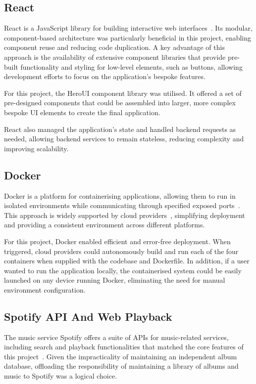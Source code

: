 \subsection{React}
React is a JavaScript library for building interactive web interfaces~\cite{React}. Its modular, component-based architecture was particularly beneficial in this project, enabling component reuse and reducing code duplication. A key advantage of this approach is the availability of extensive component libraries that provide pre-built functionality and styling for low-level elements, such as buttons, allowing development efforts to focus on the application's bespoke features.

For this project, the HeroUI component library was utilised. It offered a set of pre-designed components that could be assembled into larger, more complex bespoke UI elements to create the final application.

React also managed the application's state and handled backend requests as needed, allowing backend services to remain stateless, reducing complexity and improving scalability.

\subsection{Docker}
Docker is a platform for containerising applications, allowing them to run in isolated environments while communicating through specified exposed ports~\cite{DockerDocs}. This approach is widely supported by cloud providers~\cite{AWSDocker,GoogleDocker}, simplifying deployment and providing a consistent environment across different platforms.

For this project, Docker enabled efficient and error-free deployment. When triggered, cloud providers could autonomously build and run each of the four containers when supplied with the codebase and Dockerfile. In addition, if a user wanted to run the application locally, the containerised system could be easily launched on any device running Docker, eliminating the need for manual environment configuration.

\subsection{Spotify API And Web Playback}
The music service Spotify offers a suite of APIs for music-related services, including search and playback functionalities that matched the core features of this project~\cite{SpotifyAPI}. Given the impracticality of maintaining an independent album database, offloading the responsibility of maintaining a library of albums and music to Spotify was a logical choice.


